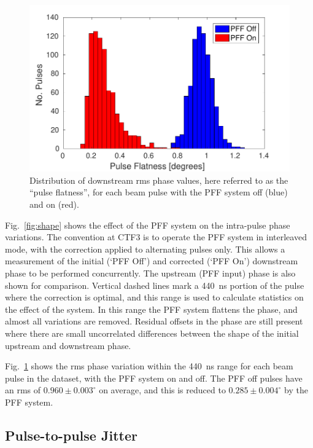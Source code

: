 \documentclass[%
 reprint,
 amsmath,amssymb,
 prl,
]{revtex4-1}
\begin{document}
\begin{figure}
	\includegraphics[width=\columnwidth]{figs/flatness}%
	\caption{\label{fig:flatness}Distribution of downstream rms phase values, 
		here 
		referred to as the 
		``pulse flatness'', for each beam pulse with the PFF system off (blue) 
		and 
		on (red).}
\end{figure}

Fig.~\ref{fig:shape} shows the effect of the PFF system on the intra-pulse 
phase variations. The convention at CTF3 is to operate the PFF system in 
interleaved mode, with 
the correction applied to alternating pulses only. This allows a measurement of 
the initial (`PFF Off') and corrected (`PFF On') downstream phase to be 
performed concurrently. The upstream (PFF input) phase is also shown for 
comparison. Vertical dashed lines mark a 440~ns portion of the pulse where the 
correction is optimal, and this range is used to calculate statistics on the 
effect of the system. In this range the PFF system flattens the phase, 
and almost all variations are removed. Residual offsets in the phase are still 
present where there are small uncorrelated differences between the shape of the 
initial upstream and downstream phase.

Fig.~\ref{fig:flatness} shows the rms phase variation within the 440~ns range 
for each beam pulse in the dataset, with the PFF system on and off. The PFF off 
pulses have an rms of \(0.960\pm0.003^\circ\) on average, and this is reduced 
to \(0.285\pm0.004^\circ\) by the PFF system.


\subsection{\label{ss:meanJit}Pulse-to-pulse Jitter}
\end{document}
